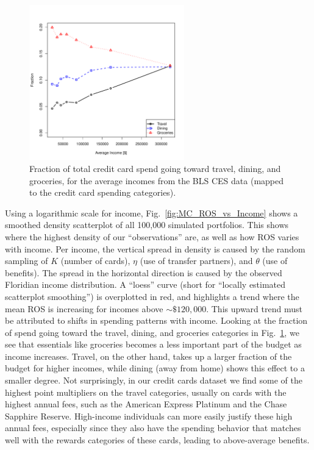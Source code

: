 \begin{figure}[t!bh]
    \begin{center}
    \includegraphics[width=0.6\textwidth]{../Figures/TravelDiningFraction.pdf}
    \caption{Fraction of total credit card spend going toward travel, dining, and groceries, for the average incomes from the BLS CES data (mapped to the credit card spending categories).}
    \label{fig:TravelDiningFraction}
    \end{center}
\end{figure}

Using a logarithmic scale for income, Fig.~\ref{fig:MC_ROS_vs_Income} shows a smoothed density scatterplot of all 100,000 simulated portfolios.  
This shows where the highest density of our ``observations'' are, as well as how ROS varies with income. 
Per income, the vertical spread in density is caused by the random sampling of $K$ (number of cards), $\eta$ (use of transfer partners), and $\theta$ (use of benefits).
The spread in the horizontal direction is caused by the observed Floridian income distribution.
A ``loess'' curve (short for ``locally estimated scatterplot smoothing'') is overplotted in red, and highlights a trend where the mean ROS is increasing for incomes above $\sim\$120,000$.
This upward trend must be attributed to shifts in spending patterns with income. 
Looking at the fraction of spend going toward the travel, dining, and groceries categories in Fig.~\ref{fig:TravelDiningFraction}, we see that essentials like groceries becomes a less important part of the budget as income increases.
Travel, on the other hand, takes up a larger fraction of the budget for higher incomes, while dining (away from home) shows this effect to a smaller degree. 
Not surprisingly, in our credit cards dataset we find some of the highest point multipliers on the travel categories, usually on cards with the highest annual fees, such as the American Express Platinum and the Chase Sapphire Reserve. 
High-income individuals can more easily justify these high annual fees, especially since they also have the spending behavior that matches well with the rewards categories of these cards, leading to above-average benefits.   

